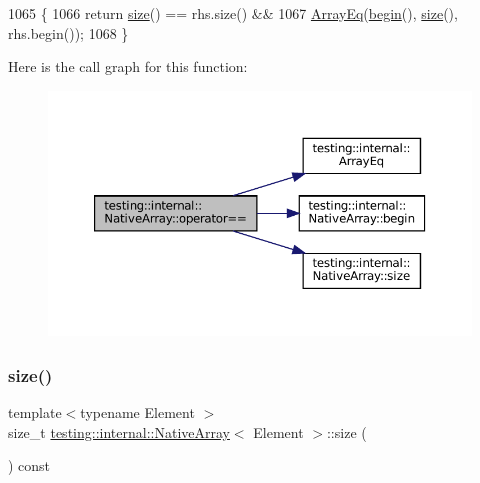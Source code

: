 \begin{DoxyCode}
1065                                                 \{
1066     \textcolor{keywordflow}{return} \hyperlink{classtesting_1_1internal_1_1NativeArray_af96a4a5ca0cdd5d163c47a081f08bd89}{size}() == rhs.size() &&
1067         \hyperlink{namespacetesting_1_1internal_af4bebf36baf0b0a5b26d051dde55fa47}{ArrayEq}(\hyperlink{classtesting_1_1internal_1_1NativeArray_a3046d93cfa23097e7b7c91f5f982dc78}{begin}(), \hyperlink{classtesting_1_1internal_1_1NativeArray_af96a4a5ca0cdd5d163c47a081f08bd89}{size}(), rhs.begin());
1068   \}
\end{DoxyCode}
Here is the call graph for this function\+:
\nopagebreak
\begin{figure}[H]
\begin{center}
\leavevmode
\includegraphics[width=350pt]{classtesting_1_1internal_1_1NativeArray_a81b90f5739ed812610e68dc34c9e3850_cgraph}
\end{center}
\end{figure}
\mbox{\label{classtesting_1_1internal_1_1NativeArray_af96a4a5ca0cdd5d163c47a081f08bd89}} 
\subsubsection{\texorpdfstring{size()}{size()}}
{\footnotesize\ttfamily template$<$typename Element $>$ \\
size\+\_\+t \hyperlink{classtesting_1_1internal_1_1NativeArray}{testing\+::internal\+::\+Native\+Array}$<$ Element $>$\+::size (\begin{DoxyParamCaption}{ }\end{DoxyParamCaption}) const\hspace{0.3cm}{\ttfamily [inline]}}



